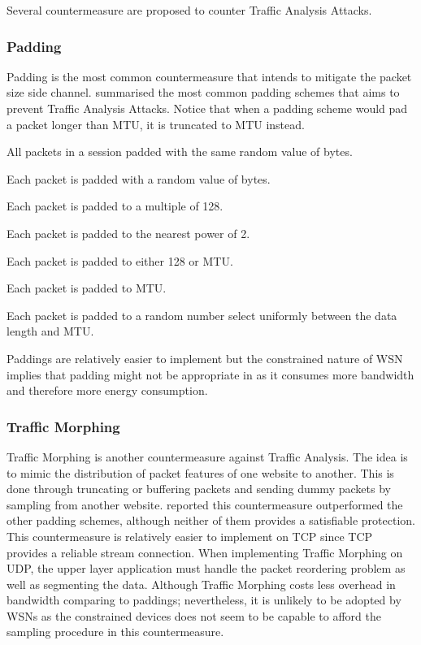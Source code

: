 Several countermeasure are proposed to counter Traffic Analysis Attacks. 

\subsubsection{Padding}

Padding is the most common countermeasure that intends to mitigate the packet size side channel. \cite{Peekaboo} summarised the most common padding schemes that aims to prevent Traffic Analysis Attacks. Notice that when a padding scheme would pad a packet longer than MTU, it is truncated to MTU instead.

\begin{description}[style=nextline]
	\item[Session Random Padding] 
	All packets in a session padded with the same random value of bytes.
	\item[Packet Random Padding]
	Each packet is padded with a random value of bytes.
	\item[Linear Padding]
	Each packet is padded to a multiple of 128.
	\item[Exponential Padding]
	Each packet is padded to the nearest power of 2.
	\item[Mice-Elephants Padding]
	Each packet is padded to either 128 or MTU.
	\item[Pad to MTU]
	Each packet is padded to MTU.
	\item[Packet Random MTU Padding]
	Each packet is padded to a random number select uniformly between the data length and MTU.
\end{description}

Paddings are relatively easier to implement but the constrained nature of WSN implies that padding might not be appropriate in as it consumes more bandwidth and therefore more energy consumption.

\subsubsection{Traffic Morphing}

Traffic Morphing\cite{TrafficMorphing} is another countermeasure against Traffic Analysis. The idea is to mimic the distribution of packet features of one website to another. This is done through truncating or buffering packets and sending dummy packets by sampling from another website. \cite{Peekaboo} reported this countermeasure outperformed the other padding schemes, although neither of them provides a satisfiable protection. This countermeasure is relatively easier to implement on TCP since TCP provides a reliable stream connection. When implementing Traffic Morphing on UDP, the upper layer application must handle the packet reordering problem as well as segmenting the data. Although Traffic Morphing costs less overhead in bandwidth comparing to paddings; nevertheless, it is unlikely to be adopted by WSNs as the constrained devices does not seem to be capable to afford the sampling procedure in this countermeasure.

